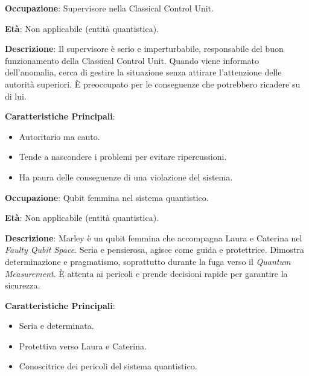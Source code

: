 \vspace{0.5cm}

\begin{tcolorbox}[colback=white,colframe=black,title=\textbf{Supervisore della Classical Control Unit}]
\begin{multicols}{2}
\textbf{Occupazione}: Supervisore nella Classical Control Unit.

\textbf{Età}: Non applicabile (entità quantistica).

\textbf{Descrizione}: Il supervisore è serio e imperturbabile, responsabile del buon funzionamento della Classical Control Unit. Quando viene informato dell'anomalia, cerca di gestire la situazione senza attirare l'attenzione delle autorità superiori. È preoccupato per le conseguenze che potrebbero ricadere su di lui.

\textbf{Caratteristiche Principali}:
\begin{itemize}
    \item Autoritario ma cauto.
    \item Tende a nascondere i problemi per evitare ripercussioni.
    \item Ha paura delle conseguenze di una violazione del sistema.
\end{itemize}
\end{multicols}
\end{tcolorbox}

\vspace{0.5cm}


\begin{tcolorbox}[colback=white,colframe=black,title=\textbf{Qubit-Marley}]
\begin{multicols}{2}
\textbf{Occupazione}: Qubit femmina nel sistema quantistico.

\textbf{Età}: Non applicabile (entità quantistica).

\textbf{Descrizione}: Marley è un qubit femmina che accompagna Laura e Caterina nel \emph{Faulty Qubit Space}. Seria e pensierosa, agisce come guida e protettrice. Dimostra determinazione e pragmatismo, soprattutto durante la fuga verso il \emph{Quantum Measurement}. È attenta ai pericoli e prende decisioni rapide per garantire la sicurezza.

\textbf{Caratteristiche Principali}:
\begin{itemize}
    \item Seria e determinata.
    \item Protettiva verso Laura e Caterina.
    \item Conoscitrice dei pericoli del sistema quantistico.
\end{itemize}
\end{multicols}
\end{tcolorbox}

